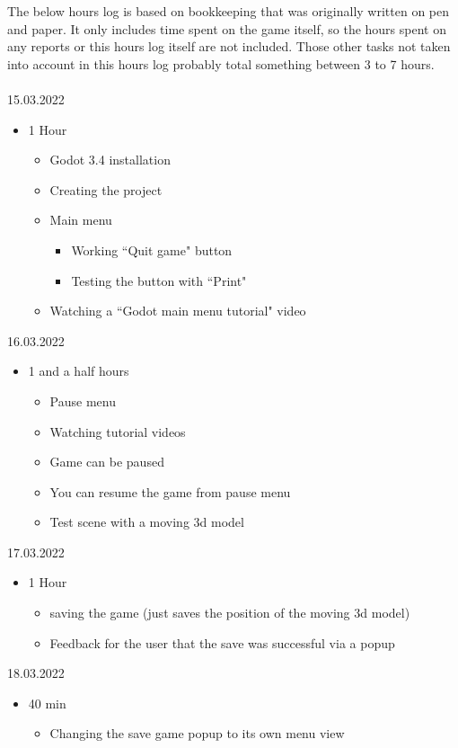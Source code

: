 \documentclass{article}
\begin{document}
The below hours log is based on bookkeeping that was originally written on pen and paper. It only includes time spent on the game itself, so the hours spent on any reports or this hours log itself are not included. Those other tasks not taken into account in this hours log probably total something between 3 to 7 hours.\\\\
15.03.2022
\begin{itemize}
	\item 1 Hour
	\begin{itemize}
		\item Godot 3.4 installation
		\item Creating the project
		\item Main menu
		\begin{itemize}
			\item Working ``Quit game" button
			\item Testing the button with ``Print"
		\end{itemize}
	\item Watching a ``Godot main menu tutorial" video
	\end{itemize}
\end{itemize}

16.03.2022
\begin{itemize}
	\item 1 and a half hours
	\begin{itemize}
		\item Pause menu
		\item Watching tutorial videos
		\item Game can be paused
		\item You can resume the game from pause menu
		\item Test scene with a moving 3d model
	\end{itemize}
\end{itemize}

17.03.2022
\begin{itemize}
	\item 1 Hour
	\begin{itemize}
		\item saving the game (just saves the position of the moving 3d model)
		\item Feedback for the user that the save was successful via a popup
	\end{itemize}
\end{itemize}

18.03.2022
\begin{itemize}
	\item 40 min
	\begin{itemize}
		\item Changing the save game popup to its own menu view
	\end{itemize}
\end{itemize}
\end{document}
